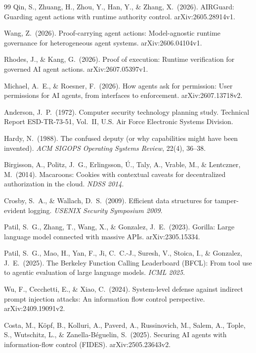 \documentclass[10pt,twocolumn]{article}
\begin{document}
\begin{thebibliography}{99}
Qin, S., Zhuang, H., Zhou, Y., Han, Y., \& Zhang, X.\ (2026).
AIRGuard: Guarding agent actions with runtime authority control.
arXiv:2605.28914v1.

Wang, Z.\ (2026).
Proof-carrying agent actions: Model-agnostic runtime governance for
heterogeneous agent systems.
arXiv:2606.04104v1.

Rhodes, J., \& Kang, G.\ (2026).
Proof of execution: Runtime verification for governed AI agent actions.
arXiv:2607.05397v1.

Michael, A.~E., \& Roesner, F.\ (2026).
How agents ask for permission: User permissions for AI agents, from
interfaces to enforcement.
arXiv:2607.13718v2.

Anderson, J.~P.\ (1972).
Computer security technology planning study.
Technical Report ESD-TR-73-51, Vol.~II, U.S. Air Force Electronic Systems
Division.

Hardy, N.\ (1988).
The confused deputy (or why capabilities might have been invented).
\emph{ACM SIGOPS Operating Systems Review}, 22(4), 36--38.

Birgisson, A., Politz, J.~G., Erlingsson, \'U., Taly, A., Vrable, M., \&
Lentczner, M.\ (2014).
Macaroons: Cookies with contextual caveats for decentralized authorization
in the cloud.
\emph{NDSS 2014}.

Crosby, S.~A., \& Wallach, D.~S.\ (2009).
Efficient data structures for tamper-evident logging.
\emph{USENIX Security Symposium 2009}.

Patil, S.~G., Zhang, T., Wang, X., \& Gonzalez, J.~E.\ (2023).
Gorilla: Large language model connected with massive APIs.
arXiv:2305.15334.

Patil, S.~G., Mao, H., Yan, F., Ji, C.~C.-J., Suresh, V., Stoica, I., \&
Gonzalez, J.~E.\ (2025).
The Berkeley Function Calling Leaderboard (BFCL): From tool use to agentic
evaluation of large language models.
\emph{ICML 2025}.

Wu, F., Cecchetti, E., \& Xiao, C.\ (2024).
System-level defense against indirect prompt injection attacks: An
information flow control perspective.
arXiv:2409.19091v2.

Costa, M., K\"opf, B., Kolluri, A., Paverd, A., Russinovich, M., Salem, A.,
Tople, S., Wutschitz, L., \& Zanella-B\'eguelin, S.\ (2025).
Securing AI agents with information-flow control (FIDES).
arXiv:2505.23643v2.


\end{thebibliography}
\end{document}
